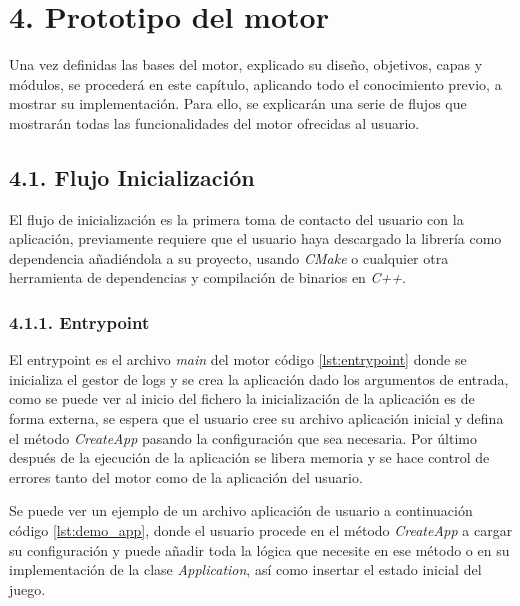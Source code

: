 \chapter*{4. Prototipo del motor}\label{cap:prototype}

Una vez definidas las bases del motor, explicado su diseño, objetivos, capas y módulos, se procederá en este 
capítulo, aplicando todo el conocimiento previo, a mostrar su implementación. Para ello, se explicarán una serie
de flujos que mostrarán todas las funcionalidades del motor ofrecidas al usuario.

\section*{4.1. Flujo Inicialización}\label{sec:workflow_init}

El flujo de inicialización es la primera toma de contacto del usuario con la aplicación, previamente requiere que el usuario
haya descargado la librería como dependencia añadiéndola a su proyecto, usando \textit{CMake}\cite{cmake-tutorial} o cualquier otra
herramienta de dependencias y compilación de binarios en \textit{C++}.

\subsection*{4.1.1. Entrypoint}\label{sec:workflow_init_entrypoint}
El entrypoint es el archivo \textit{main} del motor código \ref{lst:entrypoint} donde se inicializa el gestor de logs
y se crea la aplicación dado los argumentos de entrada, como se puede ver al inicio del fichero la inicialización de la aplicación es de forma externa, se espera
que el usuario cree su archivo aplicación inicial y defina el método \textit{CreateApp} pasando la configuración que sea
necesaria. Por último después de la ejecución de la aplicación se libera memoria y se hace control de errores tanto del motor
como de la aplicación del usuario.


Se puede ver un ejemplo de un archivo aplicación de usuario a continuación código \ref{lst:demo_app}, donde
el usuario procede en el método \textit{CreateApp} a cargar su configuración y puede añadir toda la lógica que necesite
en ese método o en su implementación de la clase \textit{Application}, así como insertar el estado inicial del juego.



